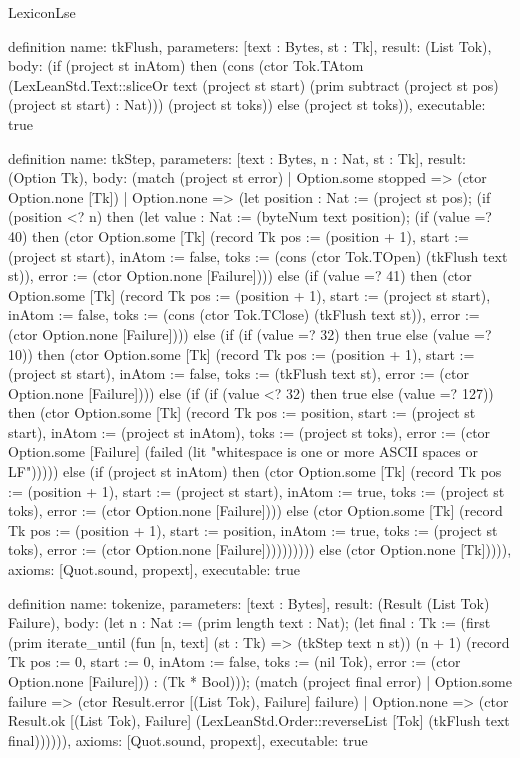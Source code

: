 \begin{lexlean}{LexiconLse}
\begin{semanticmodule}
definition{
  name: tkFlush,
  parameters: [text : Bytes, st : Tk],
  result: (List Tok),
  body: (if (project st inAtom) then (cons (ctor Tok.TAtom (LexLeanStd.Text::sliceOr text (project st start) (prim subtract (project st pos) (project st start) : Nat))) (project st toks)) else (project st toks)),
  executable: true
}

definition{
  name: tkStep,
  parameters: [text : Bytes, n : Nat, st : Tk],
  result: (Option Tk),
  body: (match (project st error)
    | Option.some stopped => (ctor Option.none [Tk])
    | Option.none => (let position : Nat := (project st pos); (if (position <? n) then (let value : Nat := (byteNum text position); (if (value =? 40) then (ctor Option.some [Tk] (record Tk {pos := (position + 1), start := (project st start), inAtom := false, toks := (cons (ctor Tok.TOpen) (tkFlush text st)), error := (ctor Option.none [Failure])})) else (if (value =? 41) then (ctor Option.some [Tk] (record Tk {pos := (position + 1), start := (project st start), inAtom := false, toks := (cons (ctor Tok.TClose) (tkFlush text st)), error := (ctor Option.none [Failure])})) else (if (if (value =? 32) then true else (value =? 10)) then (ctor Option.some [Tk] (record Tk {pos := (position + 1), start := (project st start), inAtom := false, toks := (tkFlush text st), error := (ctor Option.none [Failure])})) else (if (if (value <? 32) then true else (value =? 127)) then (ctor Option.some [Tk] (record Tk {pos := position, start := (project st start), inAtom := (project st inAtom), toks := (project st toks), error := (ctor Option.some [Failure] (failed (lit "whitespace is one or more ASCII spaces or LF")))})) else (if (project st inAtom) then (ctor Option.some [Tk] (record Tk {pos := (position + 1), start := (project st start), inAtom := true, toks := (project st toks), error := (ctor Option.none [Failure])})) else (ctor Option.some [Tk] (record Tk {pos := (position + 1), start := position, inAtom := true, toks := (project st toks), error := (ctor Option.none [Failure])})))))))) else (ctor Option.none [Tk])))),
  axioms: [Quot.sound, propext],
  executable: true
}

definition{
  name: tokenize,
  parameters: [text : Bytes],
  result: (Result (List Tok) Failure),
  body: (let n : Nat := (prim length text : Nat); (let final : Tk := (first (prim iterate_until (fun [n, text] (st : Tk) => (tkStep text n st)) (n + 1) (record Tk {pos := 0, start := 0, inAtom := false, toks := (nil Tok), error := (ctor Option.none [Failure])}) : (Tk * Bool))); (match (project final error)
    | Option.some failure => (ctor Result.error [(List Tok), Failure] failure)
    | Option.none => (ctor Result.ok [(List Tok), Failure] (LexLeanStd.Order::reverseList [Tok] (tkFlush text final)))))),
  axioms: [Quot.sound, propext],
  executable: true
}


\end{semanticmodule}
\end{lexlean}
